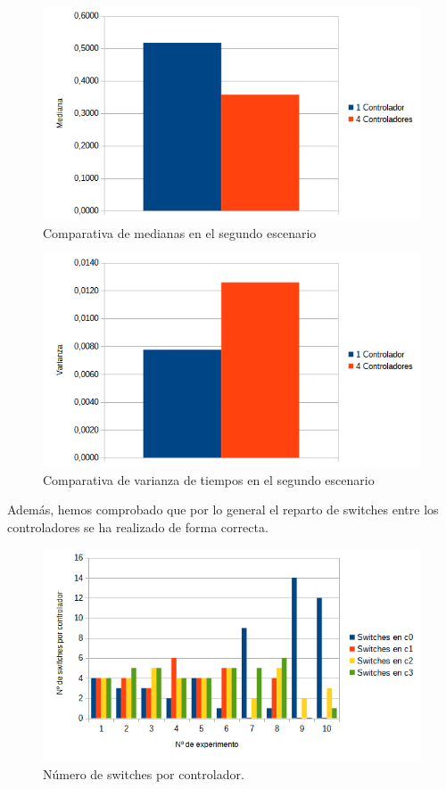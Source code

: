 \documentclass[a4paper, 12pt]{book}
\begin{document}
 	\begin{figure}[H]
 		\centering
 		\includegraphics[width=12cm, keepaspectratio]{img/comparativamedianamesh}
 		\caption{Comparativa de medianas en el segundo escenario}
 		\label{figura:medianamesh}
 	\end{figure}
 	
 	\begin{figure}[H]
 		\centering
 		\includegraphics[width=12cm, keepaspectratio]{img/comparativavarianzamesh}
 		\caption{Comparativa de varianza de tiempos en el segundo escenario}
 		\label{figura:varianzamesh}
 	\end{figure}
 	
 	
 	Además, hemos comprobado que por lo general el reparto de switches entre los controladores se ha realizado de forma correcta.
	
	
	\begin{figure}[H]
		\centering
		\includegraphics[width=16cm, keepaspectratio]{img/switchesporcontrollermesh}
		\caption{Número de switches por controlador.}
		\label{figura:switchesporcontrollermesh}
	\end{figure}
	
\end{document}
